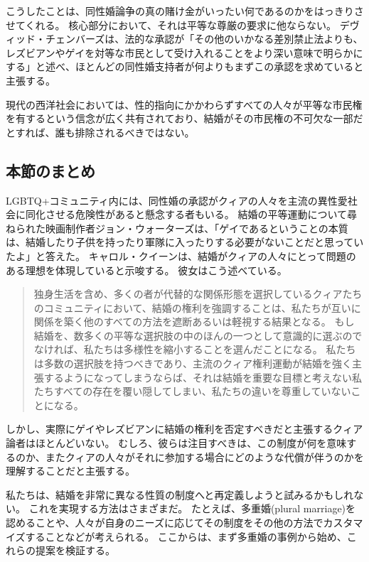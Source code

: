 \documentclass[paper=a4,book,openany]{jlreq}
\newcommand{\ig}[1]{}           %
\begin{document}
こうしたことは、同性婚論争の真の賭け金がいったい何であるのかをはっきりさせてくれる。
核心部分において、それは平等な尊厳の要求に他ならない。
デヴィッド・チェンバーズは、法的な承認が「その他のいかなる差別禁止法よりも、レズビアンやゲイを対等な市民として受け入れることをより深い意味で明らかにする」と述べ、ほとんどの同性婚支持者が何よりもまずこの承認を求めていると主張する\citep[p.450]{chambers96:_what_if}。
\ig{David L. Chambers}
現代の西洋社会においては、性的指向にかかわらずすべての人々が平等な市民権を有するという信念が広く共有されており、結婚がその市民権の不可欠な一部だとすれば、誰も排除されるべきではない。

\subsection{本節のまとめ}

LGBTQ+コミュニティ内には、同性婚の承認がクィアの人々を主流の異性愛社会に同化させる危険性があると懸念する者もいる。
結婚の平等運動について尋ねられた映画制作者ジョン・ウォーターズは、「ゲイであるということの本質は、結婚したり子供を持ったり軍隊に入ったりする必要がないことだと思っていたよ」と答えた\citep{haag13:_unqueer_world}。
キャロル・クイーンは、結婚がクィアの人々にとって問題のある理想を体現していると示唆する。
彼女はこう述べている。

\begin{quote}
独身生活を含め、多くの者が代替的な関係形態を選択しているクィアたちのコミュニティにおいて、結婚の権利を強調することは、私たちが互いに関係を築く他のすべての方法を遮断あるいは軽視する結果となる。
もし結婚を、数多くの平等な選択肢の中のほんの一つとして意識的に選ぶのでなければ、私たちは多様性を縮小することを選んだことになる。
私たちは多数の選択肢を持つべきであり、主流のクィア権利運動が結婚を強く主張するようになってしまうならば、それは結婚を重要な目標と考えない私たちすべての存在を覆い隠してしまい、私たちの違いを尊重していないことになる。
\citep[p.111]{queen04:_never_brides_never_bride}

\end{quote}

しかし、実際にゲイやレズビアンに結婚の権利を否定すべきだと主張するクィア論者はほとんどいない。
むしろ、彼らは注目すべきは、この制度が何を意味するのか、またクィアの人々がそれに参加する場合にどのような代償が伴うのかを理解することだと主張する。

私たちは、結婚を非常に異なる性質の制度へと再定義しようと試みるかもしれない。
これを実現する方法はさまざまだ。
たとえば、多重婚(plural marriage)を認めることや、人々が自身のニーズに応じてその制度をその他の方法でカスタマイズすることなどが考えられる。
ここからは、まず多重婚の事例から始め、これらの提案を検証する。
\end{document}
